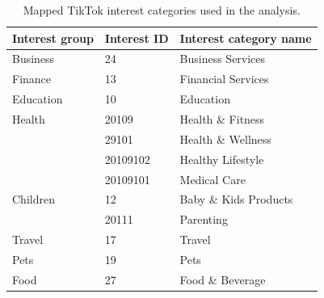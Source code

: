 \begin{table}[ht]
\centering
\caption{Mapped TikTok interest categories used in the analysis.}
\label{tab:interest-categories}
\begin{tabular}{lll}
\toprule
\textbf{Interest group} & \textbf{Interest ID} & \textbf{Interest category name} \\
\midrule
Business  & 24       & Business Services \\
Finance   & 13       & Financial Services \\
Education & 10       & Education \\
Health    & 20109    & Health \& Fitness \\
          & 29101    & Health \& Wellness \\
          & 20109102 & Healthy Lifestyle \\
          & 20109101 & Medical Care \\
Children  & 12       & Baby \& Kids Products \\
          & 20111    & Parenting \\
Travel    & 17       & Travel \\
Pets      & 19       & Pets \\
Food      & 27       & Food \& Beverage \\
\bottomrule
\end{tabular}
\end{table}
